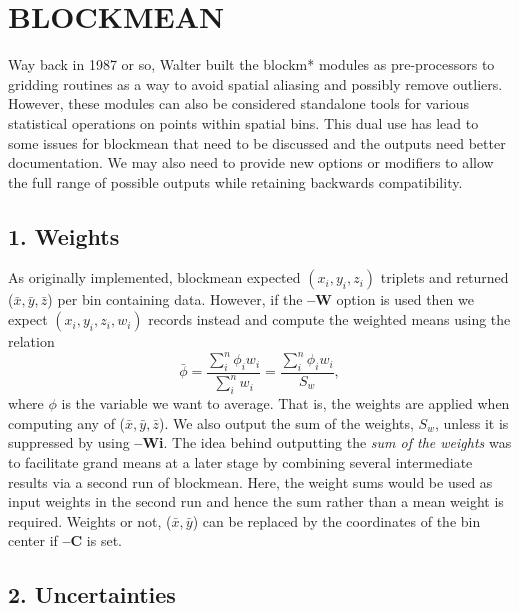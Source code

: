 \documentclass[12pt,letterpaper,margin=0.5in]{report}
\begin{document}
\section*{BLOCKMEAN}

Way back in 1987 or so, Walter built the blockm* modules as pre-processors to gridding routines as a way to avoid spatial aliasing
and possibly remove outliers.  However, these modules can also be considered standalone tools for various
statistical operations on points within spatial bins.  This dual use has lead to some issues for blockmean that need to
be discussed and the outputs need better documentation.  We may also need to provide new options or modifiers
to allow the full range of possible outputs while retaining backwards compatibility.

\subsection*{1. Weights}
As originally implemented, blockmean expected $(x_i,y_i,z_i)$ triplets and returned ($\bar{x}, \bar{y}, \bar{z}$)
per bin containing data.
However, if the {\bf --W} option is used then we expect $(x_i,y_i,z_i,w_i)$ records instead and compute the weighted means
using the relation
\begin{equation}
	\bar{\phi} = \frac{\sum_i^n \phi_i w_i}{\sum_i^n w_i} = \frac{\sum_i^n \phi_i w_i}{S_w},
	\label{eq:weighted}
\end{equation}
where $\phi$ is the variable we want to average.  That is, the weights are applied when computing any of  ($\bar{x}, \bar{y}, \bar{z}$).
We also output the sum of the weights, $S_w$, unless it is suppressed by using {\bf--Wi}.  The idea
behind outputting the \emph{sum of the weights} was to facilitate grand means at a later stage by combining several
intermediate results via a second run of blockmean.  Here, the weight sums would be used as input weights in the second
run and hence the sum rather than a mean weight is required.
Weights or not, ($\bar{x}, \bar{y}$) can be replaced by the coordinates of the bin center if {\bf --C} is set.

\subsection*{2. Uncertainties}
\end{document}
